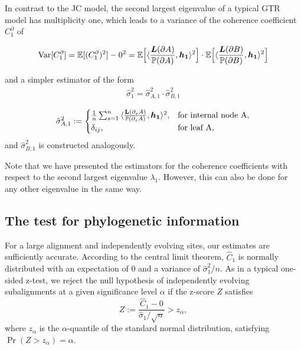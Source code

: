 \medskip

In contrast to the JC model, the second largest eigenvalue of a typical GTR model has multiplicity one, which leads to a variance of the coherence coefficient $C_1^\partial$ of

\begin{align*} 
\mathrm{Var}[C^\partial_1] = \mathbb{E}[(C^\partial_1)^2] - 0^2 = \mathbb{E}\Big[ \langle \frac{{ \bm{L}(\partial A) }}{\mathbb{P}({\partial A})}, \bm{h_1}\rangle^2 \Big] \cdot \mathbb{E} \Big[ \langle \frac{{ \bm{L}(\partial B) }}{\mathbb{P}({\partial B})},\bm{h_1}\rangle^2 \Big]
\end{align*}

and a simpler estimator of the form
\begin{align} \label{varciance_estimate_multi1}
  \hat \sigma_1^2 = \hat\sigma^2_{A,1} \cdot \hat\sigma^2_{B,1}
\end{align}

\begin{align*}
    \hat{\sigma}^2_{A,1} :=
    \begin{cases}
    \frac{1}{n}\sum_{s=1}^n \,\langle \tfrac{\mathbf{L}(\partial_sA)}{\mathbb{P}(\partial_sA)},\bm{h_1}\rangle^2,  & \text{for internal node A},\\
    \delta_{ij},&  \text{for leaf A},
    \end{cases}
\end{align*}
and $\hat{\sigma}^2_{B,1}$ is constructed analogously.

\medskip 

Note that we have presented the estimators for the coherence coefficients with respect to the second largest eigenvalue $\lambda_1$. However, this can also be done for any other eigenvalue in the same way.

\bigskip

\subsection{The test for phylogenetic information}\label{msec:test}

For a large alignment and independently evolving sites, our estimates are sufficiently accurate. According to the central limit theorem, $\hat C_1$ is normally distributed with an expectation of  0 and  a variance of $\hat\sigma^2_1/n$. As in a typical one-sided z-test, we reject the null hypothesis of independently evolving subalignments at a given significance level $\alpha$ if the z-score $Z$ satisfies
\begin{equation} \label{eq:th_zscore}
Z := \frac{\hat C_1 - 0}{\hat{\sigma}_1/\sqrt{n}} > z_\alpha,
\end{equation}
where $z_\alpha$ is the $\alpha$-quantile of the standard normal distribution, satisfying $\Pr(Z > z_\alpha) = \alpha$.

